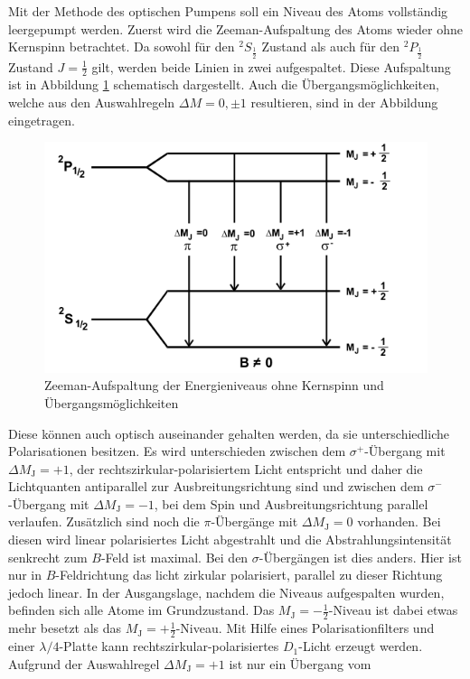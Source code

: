 Mit der Methode des optischen Pumpens soll ein Niveau des Atoms vollständig leergepumpt werden. Zuerst wird die Zeeman-Aufspaltung des Atoms wieder ohne Kernspinn betrachtet. Da sowohl für den $^2S_\frac{1}{2}$ Zustand
als auch für den $^2P_\frac{1}{2}$ Zustand $J=\frac{1}{2}$ gilt, werden beide Linien in zwei aufgespaltet. Diese Aufspaltung ist in Abbildung \ref{abb:abb3} schematisch dargestellt. Auch die Übergangsmöglichkeiten,
welche aus den Auswahlregeln $\Delta M=0, \pm 1$ resultieren, sind in der Abbildung eingetragen.
\begin{figure}[H]
	\centering
	\includegraphics[width=12cm]{abb3.jpg}
	\caption{Zeeman-Aufspaltung der Energieniveaus ohne Kernspinn und Übergangsmöglichkeiten \cite{V21}}
	\label{abb:abb3}
\end{figure}
Diese können auch optisch auseinander gehalten werden, da sie unterschiedliche Polarisationen besitzen. Es wird unterschieden zwischen dem $\sigma^+$-Übergang mit $\Delta M_\text{J}=+1$, der rechtszirkular-polarisiertem
Licht entspricht und daher die Lichtquanten antiparallel zur Ausbreitungsrichtung sind und zwischen dem $\sigma^-$-Übergang mit $\Delta M_\text{J}=-1$, bei dem Spin und Ausbreitungsrichtung parallel verlaufen. Zusätzlich
sind noch die $\pi$-Übergänge mit $\Delta M_\text{J}=0$ vorhanden. Bei diesen wird linear polarisiertes Licht abgestrahlt und die Abstrahlungsintensität senkrecht zum $B$-Feld ist maximal.
Bei den $\sigma$-Übergängen ist dies anders. Hier ist nur in $B$-Feldrichtung das licht zirkular polarisiert, parallel zu dieser Richtung jedoch linear.
In der Ausgangslage, nachdem die Niveaus aufgespalten wurden, befinden sich alle Atome im Grundzustand. Das $M_\text{J}=-\frac{1}{2}$-Niveau ist dabei etwas mehr besetzt als das $M_\text{J}=+\frac{1}{2}$-Niveau.
Mit Hilfe eines Polarisationfilters und einer $\lambda /4$-Platte kann rechtszirkular-polarisiertes $D_1$-Licht erzeugt werden. Aufgrund der Auswahlregel $\Delta M_\text{J}=+1$ ist nur ein Übergang vom
